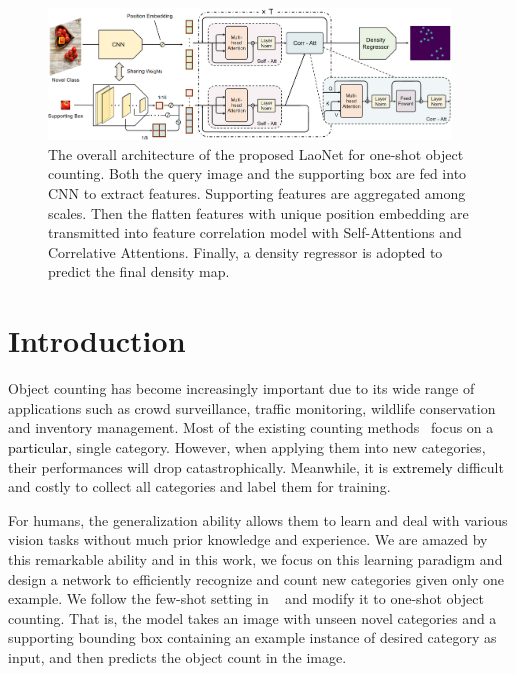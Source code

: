 \documentclass{article}
\newcommand\XP[1]{\textcolor{black}{#1}}%
\begin{document}
\begin{figure}[t]
    \centering
    \includegraphics[width = 0.95\textwidth]{network.png}
    \caption{The overall architecture of the proposed LaoNet for one-shot object counting. Both the query image and the supporting box are fed into CNN to extract features. Supporting features are aggregated among scales. Then the flatten features with unique position embedding are transmitted into feature correlation model with Self-Attentions and Correlative Attentions. Finally, a density regressor is adopt\XP{ed} to predict the final density map. }
    \label{fig:network}
\end{figure}




\section{Introduction}

Object counting has become increasingly important due to its wide range of applications such as crowd surveillance, traffic monitoring, wildlife conservation and inventory management. Most of the existing counting methods~\cite{zhang2016single, ma2019bayesian, biswas2017automatic} focus on a \XP{particular,} single category. However, when applying them into new categories, their performances will drop catastrophically. Meanwhile, it is \XP{extremely} difficult and costly to collect all categories and label them for training. 

For humans, the generalization ability allows them to learn and deal with various vision tasks without much prior knowledge and experience. We are amazed by this remarkable ability and in this work, we focus on this learning paradigm and design a network to efficiently recognize and count new categories given only one example. We follow the few-shot setting in ~\cite{ranjan2021learning} and modify it to one-shot object counting. That is, the model takes an image with unseen novel categories and a supporting bounding box containing an example instance of desired category as input, and then predicts the object count in the image. 
\end{document}
